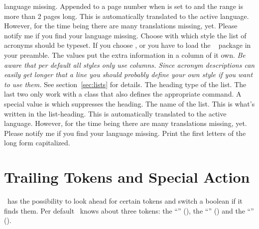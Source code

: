 \documentclass{acro-manual}
\begin{document}
\begin{options}
    language missing.
    Appended to a page number when  is set to
     and the range is more than 2 pages long.  This is
    automatically translated to the active language.  However, for the time 
    being there are many translations missing, yet.  Please notify me if you
    find your language missing.
    Choose with which style the list of acronyms should be
    typeset.  If you choose ,  or
     you have to load the
    ~\cite{pkg:longtable} package in your preamble.  The values
     put the extra information in a column of it
    own.  \emph{Be aware that per default \emph{all}  styles
      only use  columns.  Since acronym descriptions can easily get
      longer that a line you should probably define your own style if you want
      to use them.}  See section~\vref{sec:lists} for details.
    The heading type of the list. The last two only work
    with a \KOMAScript{} class that also defines the appropriate command.  A
    special value is  which suppresses the heading.
    The name of the list.  This is what's written in the list-heading.  This
    is automatically translated to the active language.  However, for the time
    being there are many translations missing, yet.  Please notify me if you
    find your language missing.
    Print the first letters of the long form capitalized.
\end{options}

\section{Trailing Tokens and Special Action}

\acro\ has the possibility to look ahead for certain tokens
and switch a boolean if it finds them.  Per default \acro\ knows about three
tokens: the \enquote{} (), the \enquote{}
(\code{-}) and the \enquote{} ().
\end{document}
